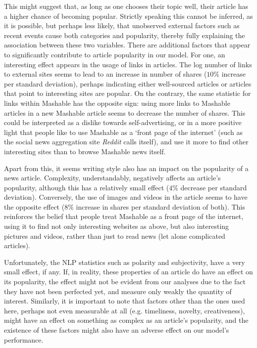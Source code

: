 \documentclass{article}
\begin{document}
This might suggest that, as long as one chooses their topic well, their article has a higher chance of becoming popular. Strictly speaking this cannot be inferred, as it is possible, but perhaps less likely, that unobserved external factors such as recent events cause both categories and popularity, thereby fully explaining the association between these two variables. There are additional factors that appear to significantly contribute to article popularity in our model. For one, an interesting effect appears in the usage of links in articles. The log number of links to external sites seems to lead to an increase in number of shares ($10\%$ increase per standard deviation), perhaps indicating either well-sourced articles or articles that point to interesting sites are popular. On the contrary, the same statistic for links within Mashable has the opposite sign: using more links to Mashable articles in a new Mashable article seems to decrease the number of shares. This could be interpreted as a dislike towards self-advertising, or in a more positive light that people like to use Mashable as a `front page of the internet' (such as the social news aggregation site \emph{Reddit} calls itself), and use it more to find other interesting sites than to browse Mashable news itself.

Apart from this, it seems writing style also has an impact on the popularity of a news article. Complexity, understandably, negatively affects an article's popularity, although this has a relatively small effect ($4\%$ decrease per standard deviation). Conversely, the use of images and videos in the article seems to have the opposite effect ($8\%$ increase in shares per standard deviation of both). This reinforces the belief that people treat Mashable as a front page of the internet, using it to find not only interesting websites as above, but also interesting pictures and videos, rather than just to read news (let alone complicated articles).

Unfortunately, the NLP statistics such as polarity and subjectivity, have a very small effect, if any. If, in reality, these properties of an article do have an effect on its popularity, the effect might not be evident from our analyses due to the fact they have not been perfected yet, and measure only weakly the quantity of interest. Similarly, it is important to note that factors other than the ones used here, perhaps not even measurable at all (e.g. timeliness, novelty, creativeness), might have an effect on something as complex as an article's popularity, and the existence of these factors might also have an adverse effect on our model's performance.
\end{document}
